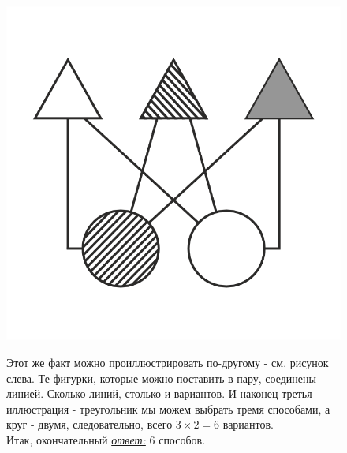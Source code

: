 \begin{figure}[h!]
\begin{minipage}{0.15\linewidth}
    \includegraphics[width=0.9\columnwidth]{./img/komb}
\end{minipage}
\begin{minipage}{0.84\linewidth}\setlength{\parindent}{1.5em}
Этот же факт можно проиллюстрировать по-другому - см. рисунок слева. Те фигурки, которые можно поставить в пару, соединены линией. Сколько линий, столько и вариантов. И наконец третья иллюстрация - треугольник мы можем выбрать тремя способами, а круг - двумя, следовательно, всего $3 \times 2 = 6$ вариантов.\\ Итак, окончательный \underline{\textit{ответ:}} 6 способов.
\end{minipage}
\end{figure}


